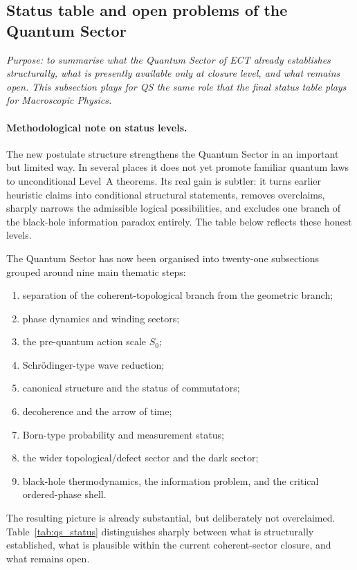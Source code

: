 \documentclass[11pt,a4paper]{article}
\numberwithin{equation}{section}
\begin{document}
\subsection{Status table and open problems of the Quantum Sector}
\label{sec:qs_status}
\label{sec:derivation_map}
\label{sec:open_problems}

\textit{Purpose: to summarise what the Quantum Sector of ECT already
establishes structurally, what is presently available only at closure
level, and what remains open.
This subsection plays for QS the same role that the final status table
plays for Macroscopic Physics.}

\medskip
\paragraph{Methodological note on status levels.}
The new postulate structure strengthens the Quantum Sector in an
important but limited way.
In several places it does not yet promote familiar quantum laws
to unconditional Level~A theorems.
Its real gain is subtler: it turns earlier heuristic claims into
conditional structural statements, removes overclaims, sharply
narrows the admissible logical possibilities, and excludes one
branch of the black-hole information paradox entirely.
The table below reflects these honest levels.

\medskip
The Quantum Sector has now been organised into twenty-one subsections
grouped around nine main thematic steps:
\begin{enumerate}[noitemsep,label=(\roman*)]
  \item separation of the coherent-topological branch from the
    geometric branch;
  \item phase dynamics and winding sectors;
  \item the pre-quantum action scale $S_0$;
  \item Schr\"odinger-type wave reduction;
  \item canonical structure and the status of commutators;
  \item decoherence and the arrow of time;
  \item Born-type probability and measurement status;
  \item the wider topological/defect sector and the dark sector;
  \item black-hole thermodynamics, the information problem, and
    the critical ordered-phase shell.
\end{enumerate}
The resulting picture is already substantial, but deliberately not
overclaimed.
Table~\ref{tab:qs_status} distinguishes sharply between what is
structurally established, what is plausible within the current
coherent-sector closure, and what remains open.
\end{document}
